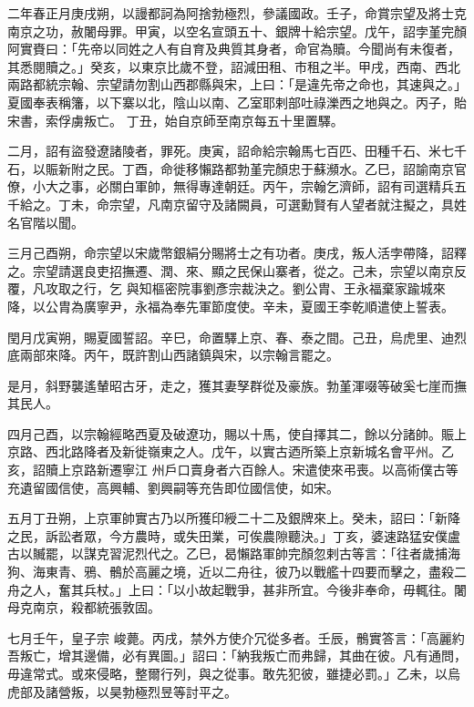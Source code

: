 \begin{pinyinscope}
 二年春正月庚戌朔，以謾都訶為阿捨勃極烈，參議國政。壬子，命賞宗望及將士克南京之功，赦闍母罪。甲寅，以空名宣頭五十、銀牌十給宗望。戊午，詔孛堇完顏阿實賚曰：「先帝以同姓之人有自育及典質其身者，命官為贖。今聞尚有未復者，其悉閱贖之。」癸亥，以東京比歲不登，詔減田租、市租之半。甲戌，西南、西北兩路都統宗翰、宗望請勿割山西郡縣與宋，上曰：「是違先帝之命也，其速與之。」夏國奉表稱籓，以下寨以北，陰山以南、乙室耶剌部吐祿濼西之地與之。丙子，貽宋書，索俘虜叛亡。
 丁丑，始自京師至南京每五十里置驛。



 二月，詔有盜發遼諸陵者，罪死。庚寅，詔命給宗翰馬七百匹、田種千石、米七千石，以賑新附之民。丁酉，命徙移懶路都勃堇完顏忠于蘇瀕水。乙巳，詔諭南京官僚，小大之事，必關白軍帥，無得專達朝廷。丙午，宗翰乞濟師，詔有司選精兵五千給之。丁未，命宗望，凡南京留守及諸闕員，可選勳賢有人望者就注擬之，具姓名官階以聞。



 三月己酉朔，命宗望以宋歲幣銀絹分賜將士之有功者。庚戌，叛人活孛帶降，詔釋之。宗望請選良吏招撫遷、潤、來、顯之民保山寨者，從之。己未，宗望以南京反覆，凡攻取之行，乞
 與知樞密院事劉彥宗裁決之。劉公胄、王永福棄家踰城來降，以公胄為廣寧尹，永福為奉先軍節度使。辛未，夏國王李乾順遣使上誓表。



 閏月戊寅朔，賜夏國誓詔。辛巳，命置驛上京、春、泰之間。己丑，烏虎里、迪烈底兩部來降。丙午，既許割山西諸鎮與宋，以宗翰言罷之。



 是月，斜野襲遙輦昭古牙，走之，獲其妻孥群從及豪族。勃堇渾啜等破奚七崖而撫其民人。



 四月己酉，以宗翰經略西夏及破遼功，賜以十馬，使自擇其二，餘以分諸帥。賑上京路、西北路降者及新徙嶺東之人。戊午，以實古迺所築上京新城名會平州。乙亥，詔贖上京路新遷寧江
 州戶口賣身者六百餘人。宋遣使來弔喪。以高術僕古等充遺留國信使，高興輔、劉興嗣等充告即位國信使，如宋。



 五月丁丑朔，上京軍帥實古乃以所獲印綬二十二及銀牌來上。癸未，詔曰：「新降之民，訴訟者眾，今方農時，或失田業，可俟農隙聽決。」丁亥，婆速路猛安僕盧古以贓罷，以謀克習泥烈代之。乙巳，曷懶路軍帥完顏忽剌古等言：「往者歲捕海狗、海東青、鴉、鶻於高麗之境，近以二舟往，彼乃以戰艦十四要而擊之，盡殺二舟之人，奮其兵杖。」上曰：「以小故起戰爭，甚非所宜。今後非奉命，毋輒往。闍母克南京，殺都統張敦固。



 七月壬午，皇子宗
 峻薨。丙戌，禁外方使介冗從多者。壬辰，鶻實答言：「高麗約吾叛亡，增其邊備，必有異圖。」詔曰：「納我叛亡而弗歸，其曲在彼。凡有通問，毋違常式。或來侵略，整爾行列，與之從事。敢先犯彼，雖捷必罰。」乙未，以烏虎部及諸營叛，以昊勃極烈昱等討平之。




\end{pinyinscope}
